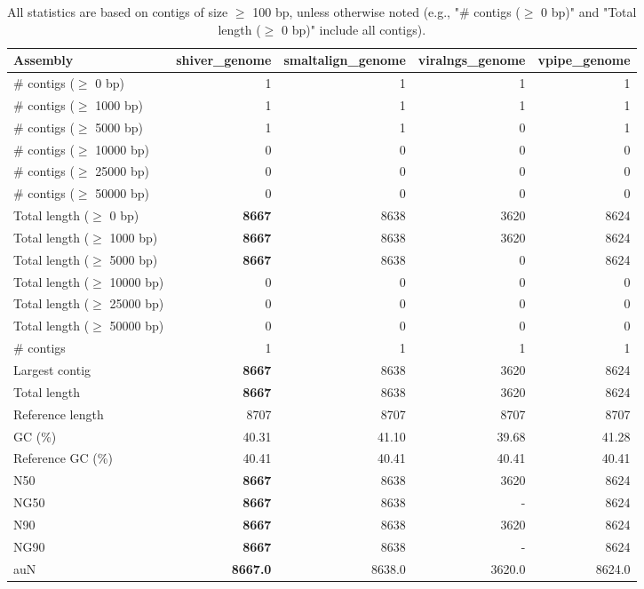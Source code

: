 \documentclass[12pt,a4paper]{article}
\begin{document}
\begin{table}[ht]
\begin{center}
\caption{All statistics are based on contigs of size $\geq$ 100 bp, unless otherwise noted (e.g., "\# contigs ($\geq$ 0 bp)" and "Total length ($\geq$ 0 bp)" include all contigs).}
\begin{tabular}{|l*{4}{|r}|}
\hline
Assembly & shiver\_genome & smaltalign\_genome & viralngs\_genome & vpipe\_genome \\ \hline
\# contigs ($\geq$ 0 bp) & 1 & 1 & 1 & 1 \\ \hline
\# contigs ($\geq$ 1000 bp) & 1 & 1 & 1 & 1 \\ \hline
\# contigs ($\geq$ 5000 bp) & 1 & 1 & 0 & 1 \\ \hline
\# contigs ($\geq$ 10000 bp) & 0 & 0 & 0 & 0 \\ \hline
\# contigs ($\geq$ 25000 bp) & 0 & 0 & 0 & 0 \\ \hline
\# contigs ($\geq$ 50000 bp) & 0 & 0 & 0 & 0 \\ \hline
Total length ($\geq$ 0 bp) & {\bf 8667} & 8638 & 3620 & 8624 \\ \hline
Total length ($\geq$ 1000 bp) & {\bf 8667} & 8638 & 3620 & 8624 \\ \hline
Total length ($\geq$ 5000 bp) & {\bf 8667} & 8638 & 0 & 8624 \\ \hline
Total length ($\geq$ 10000 bp) & 0 & 0 & 0 & 0 \\ \hline
Total length ($\geq$ 25000 bp) & 0 & 0 & 0 & 0 \\ \hline
Total length ($\geq$ 50000 bp) & 0 & 0 & 0 & 0 \\ \hline
\# contigs & 1 & 1 & 1 & 1 \\ \hline
Largest contig & {\bf 8667} & 8638 & 3620 & 8624 \\ \hline
Total length & {\bf 8667} & 8638 & 3620 & 8624 \\ \hline
Reference length & 8707 & 8707 & 8707 & 8707 \\ \hline
GC (\%) & 40.31 & 41.10 & 39.68 & 41.28 \\ \hline
Reference GC (\%) & 40.41 & 40.41 & 40.41 & 40.41 \\ \hline
N50 & {\bf 8667} & 8638 & 3620 & 8624 \\ \hline
NG50 & {\bf 8667} & 8638 & - & 8624 \\ \hline
N90 & {\bf 8667} & 8638 & 3620 & 8624 \\ \hline
NG90 & {\bf 8667} & 8638 & - & 8624 \\ \hline
auN & {\bf 8667.0} & 8638.0 & 3620.0 & 8624.0 \\ \hline

\end{tabular}
\end{center}
\end{table}
\end{document}
